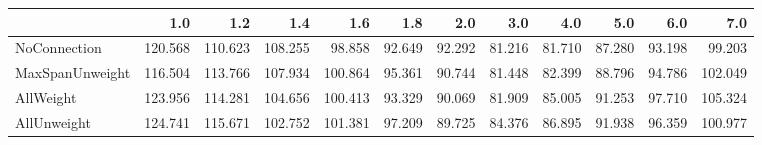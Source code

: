 \begin{tabular}{lrrrrrrrrrrr}
\toprule
{} &     1.0 &     1.2 &     1.4 &     1.6 &    1.8 &    2.0 &    3.0 &    4.0 &    5.0 &    6.0 &     7.0 \\
\midrule
NoConnection    & 120.568 & 110.623 & 108.255 &  98.858 & 92.649 & 92.292 & 81.216 & 81.710 & 87.280 & 93.198 &  99.203 \\
MaxSpanUnweight & 116.504 & 113.766 & 107.934 & 100.864 & 95.361 & 90.744 & 81.448 & 82.399 & 88.796 & 94.786 & 102.049 \\
AllWeight       & 123.956 & 114.281 & 104.656 & 100.413 & 93.329 & 90.069 & 81.909 & 85.005 & 91.253 & 97.710 & 105.324 \\
AllUnweight     & 124.741 & 115.671 & 102.752 & 101.381 & 97.209 & 89.725 & 84.376 & 86.895 & 91.938 & 96.359 & 100.977 \\
\bottomrule
\end{tabular}
